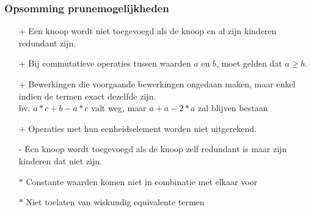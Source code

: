 \documentclass[Main.tex]{subfiles}
\begin{document}
\subsubsection*{Opsomming prunemogelijkheden} \label{{ssec:pruningregels}}
\begin{itemize}
\item[+] Een knoop wordt niet toegevoegd als de knoop en al zijn kinderen redundant zijn.
\item[+] Bij commutatieve operaties tussen waarden $a$ en $b$, moet gelden dat $a \geq b$.
\item[+] Bewerkingen die voorgaande bewerkingen ongedaan maken, maar enkel indien de termen exact dezelfde zijn.\\
	bv. $a*c+b-a*c$ valt weg, maar $a+a-2*a$ zal blijven bestaan
\item[+] Operaties met hun eenheidselement worden niet uitgerekend.
\item[-] Een knoop wordt toegevoegd als de knoop zelf redundant is maar zijn kinderen dat niet zijn.
\item[$\ast$] Constante waarden komen niet in combinatie met elkaar voor
\item[$\ast$] Niet toelaten van wiskundig equivalente termen
\end{itemize}
\end{document}
